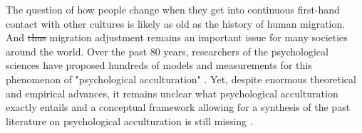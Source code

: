\documentclass[man, 12pt, a4paper, mask]{apa7}
\providecommand{\DIFaddtex}[1]{{\protect\color{blue}\uwave{#1}}} %
\providecommand{\DIFdeltex}[1]{{\protect\color{red}\sout{#1}}}                      %
\providecommand{\DIFaddbegin}{} %
\providecommand{\DIFaddend}{} %
\providecommand{\DIFdelbegin}{} %
\providecommand{\DIFdelend}{} %
\providecommand{\DIFadd}[1]{\texorpdfstring{\DIFaddtex{#1}}{#1}} %
\providecommand{\DIFdel}[1]{\texorpdfstring{\DIFdeltex{#1}}{}} %
\newcommand{\DIFscaledelfig}{0.5}
\newlength{\DIFdelgraphicswidth} %
\newlength{\DIFdelgraphicsheight} %
\newcommand{\DIFaddincludegraphics}[2][]{{\color{blue}\fbox{\DIFOincludegraphics[#1]{#2}}}} %
\newcommand{\DIFdelincludegraphics}[2][]{%
\sbox{\DIFdelgraphicsbox}{\DIFOincludegraphics[#1]{#2}}%
\settoboxwidth{\DIFdelgraphicswidth}{\DIFdelgraphicsbox} %
\settoboxtotalheight{\DIFdelgraphicsheight}{\DIFdelgraphicsbox} %
\scalebox{\DIFscaledelfig}{%
\parbox[b]{\DIFdelgraphicswidth}{\usebox{\DIFdelgraphicsbox}\\[-\baselineskip] \rule{\DIFdelgraphicswidth}{0em}}\llap{\resizebox{\DIFdelgraphicswidth}{\DIFdelgraphicsheight}{%
\setlength{\unitlength}{\DIFdelgraphicswidth}%
\begin{picture}(1,1)%
\thicklines\linethickness{2pt} %
{\color[rgb]{1,0,0}\put(0,0){\framebox(1,1){}}}%
{\color[rgb]{1,0,0}\put(0,0){\line( 1,1){1}}}%
{\color[rgb]{1,0,0}\put(0,1){\line(1,-1){1}}}%
\end{picture}%
}\hspace*{3pt}}} %
} %
\DeclareRobustCommand{\DIFaddbegin}{\DIFOaddbegin \let\includegraphics\DIFaddincludegraphics} %
\DeclareRobustCommand{\DIFaddend}{\DIFOaddend \let\includegraphics\DIFOincludegraphics} %
\DeclareRobustCommand{\DIFdelbegin}{\DIFOdelbegin \let\includegraphics\DIFdelincludegraphics} %
\DeclareRobustCommand{\DIFdelend}{\DIFOaddend \let\includegraphics\DIFOincludegraphics} %
\begin{document}
%
%
%


The question of how people change when they get into continuous first-hand contact with other cultures is likely as old as the history of human migration. And \DIFdelbegin \DIFdel{thus }\DIFdelend \DIFaddbegin \DIFadd{also today }\DIFaddend migration adjustment remains an important issue for many societies around the world. 
Over the past 80 years, researchers of the psychological sciences have proposed hundreds of models and measurements for this phenomenon of "psychological acculturation" \citep[][]{Rudmin2003a}. Yet, despite enormous theoretical and empirical advances, it remains unclear what psychological acculturation exactly entails and a conceptual framework allowing for a synthesis of the past literature on psychological acculturation is still missing \citep{Birman2014c}.
\end{document}
